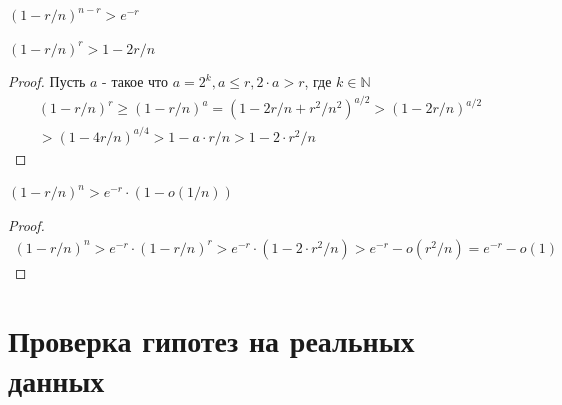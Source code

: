 \documentclass[times,specification,annotation]{itmo-student-thesis}
\begin{document}
    \begin{lemma}
        \label{exp:greater}
        $(1 - r/n)^{n - r} > e^{-r}$
    \end{lemma}

    \begin{lemma}
        \label{exp:greater2}
        $(1 - r/n)^r > 1 - 2r/n$
    \end{lemma}
    \begin{proof}
        Пусть $a$ - такое что $a = 2^k, a \leq r, 2\cdot a  > r$, где $k \in \mathbb {N}$ \\
        \begin{gather*}
        (1 - r/n)^r \geq (1 - r/n)^a = (1 - 2r/n + r^2/n^2)^{a/2} > (1 - 2r/n)^{a/2} \\
        > (1 - 4r/n)^{a/4} > 1 - a\cdot r/n > 1 - 2\cdot r^2/n
        \end{gather*}
    \end{proof}

    \begin{lemma}
        \label{exp:greaterO}
        $(1 - r/n)^n > e^{-r} \cdot (1 - o(1/n))$
    \end{lemma}
    \begin{proof}
        \begin{gather*}
        (1 - r/n)^n > e^{-r} \cdot (1 - r/n)^r > e^{-r} \cdot (1 - 2 \cdot r^2/n) > e^{-r} - o(r^2/n) = e^{-r} - o(1)
        \end{gather*}
    \end{proof}


    \chapter{Проверка гипотез на реальных данных}\label{ch:проверка-гипотез}
\end{document}
